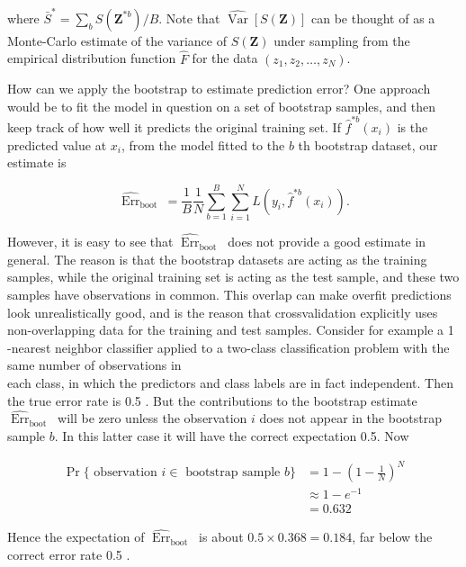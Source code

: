 \documentclass[10pt]{article}
\begin{document}
where $\bar{S}^{*}=\sum_{b} S\left(\mathbf{Z}^{* b}\right) / B$. Note that $\widehat{\operatorname{Var}}[S(\mathbf{Z})]$ can be thought of as a Monte-Carlo estimate of the variance of $S(\mathbf{Z})$ under sampling from the empirical distribution function $\hat{F}$ for the data $\left(z_{1}, z_{2}, \ldots, z_{N}\right)$.

How can we apply the bootstrap to estimate prediction error? One approach would be to fit the model in question on a set of bootstrap samples, and then keep track of how well it predicts the original training set. If $\hat{f}^{* b}\left(x_{i}\right)$ is the predicted value at $x_{i}$, from the model fitted to the $b$ th bootstrap dataset, our estimate is


\begin{equation*}
\widehat{\operatorname{Err}}_{\text {boot }}=\frac{1}{B} \frac{1}{N} \sum_{b=1}^{B} \sum_{i=1}^{N} L\left(y_{i}, \hat{f}^{* b}\left(x_{i}\right)\right) . \tag{7.54}
\end{equation*}


However, it is easy to see that $\widehat{\operatorname{Err}}_{\text {boot }}$ does not provide a good estimate in general. The reason is that the bootstrap datasets are acting as the training samples, while the original training set is acting as the test sample, and these two samples have observations in common. This overlap can make overfit predictions look unrealistically good, and is the reason that crossvalidation explicitly uses non-overlapping data for the training and test samples. Consider for example a 1 -nearest neighbor classifier applied to a two-class classification problem with the same number of observations in\\
each class, in which the predictors and class labels are in fact independent. Then the true error rate is 0.5 . But the contributions to the bootstrap estimate $\widehat{\operatorname{Err}}_{\text {boot }}$ will be zero unless the observation $i$ does not appear in the bootstrap sample $b$. In this latter case it will have the correct expectation 0.5. Now


\begin{align*}
\operatorname{Pr}\{\text { observation } i \in \text { bootstrap sample } b\} & =1-\left(1-\frac{1}{N}\right)^{N} \\
& \approx 1-e^{-1} \\
& =0.632 \tag{7.55}
\end{align*}


Hence the expectation of $\widehat{\operatorname{Err}}_{\text {boot }}$ is about $0.5 \times 0.368=0.184$, far below the correct error rate 0.5 .
\end{document}

